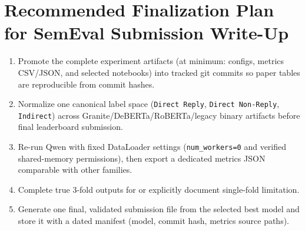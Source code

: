 \documentclass[11pt]{article}
\begin{document}
\section{Recommended Finalization Plan for SemEval Submission Write-Up}
\begin{enumerate}
    \item Promote the complete experiment artifacts (at minimum: configs, metrics CSV/JSON, and selected notebooks) into tracked git commits so paper tables are reproducible from commit hashes.
    \item Normalize one canonical label space (\texttt{Direct Reply}, \texttt{Direct Non-Reply}, \texttt{Indirect}) across Granite/DeBERTa/RoBERTa/legacy binary artifacts before final leaderboard submission.
    \item Re-run Qwen with fixed DataLoader settings (\texttt{num\_workers=0} and verified shared-memory permissions), then export a dedicated metrics JSON comparable with other families.
    \item Complete true 3-fold outputs for  or explicitly document single-fold limitation.
    \item Generate one final, validated submission file from the selected best model and store it with a dated manifest (model, commit hash, metrics source paths).
\end{enumerate}
\end{document}
